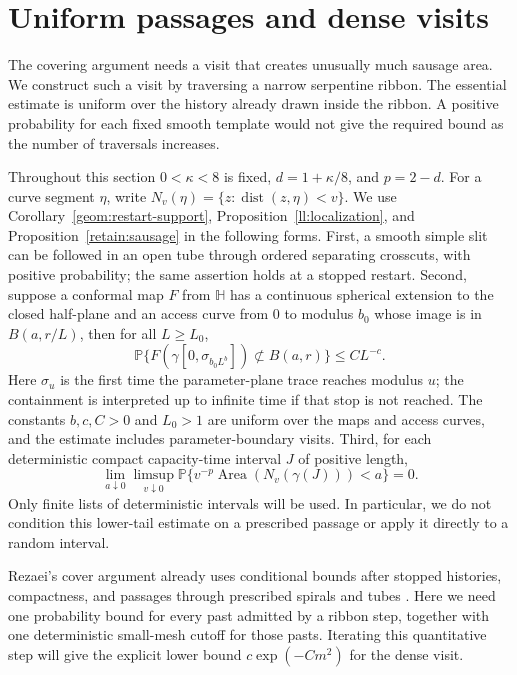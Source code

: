 \documentclass[11pt]{article}
\theoremstyle{definition}
\theoremstyle{remark}
\numberwithin{equation}{section}
\begin{document}
\section{Uniform passages and dense visits}
\label{rc:section}

The covering argument needs a visit that creates unusually much sausage
area.  We construct such a visit by traversing a narrow serpentine ribbon.
The essential estimate is uniform over the history already drawn inside
the ribbon.  A positive probability for each fixed smooth template would
not give the required bound as the number of traversals increases.

Throughout this section $0<\kappa<8$ is fixed,
$d=1+\kappa/8$, and $p=2-d$.  For a curve segment $\eta$, write
$N_v(\eta)=\{z:\operatorname{dist}(z,\eta)<v\}$.
We use Corollary~\ref{geom:restart-support}, Proposition~\ref{ll:localization}, and Proposition~\ref{retain:sausage} in the following forms.  First, a smooth simple
slit can be followed in an open tube through ordered separating
crosscuts, with positive probability; the same assertion holds at a
stopped restart. Second, suppose a conformal map $F$ from $\mathbb H$ has a
continuous spherical extension to the closed half-plane and an access
curve from $0$ to modulus $b_0$ whose image is in $B(a,r/L)$, then
for all $L\ge L_0$,
\begin{equation}\label{rc:localization-input}
 \mathbb P\{F(\gamma[0,\sigma_{b_0L^b}])
                    \not\subset B(a,r)\}\le C L^{-c}.
\end{equation}
Here $\sigma_u$ is the first time the parameter-plane trace reaches modulus
$u$; the containment is interpreted up to infinite time if that stop is
not reached.  The constants $b,c,C>0$ and $L_0>1$ are uniform over the
maps and access curves, and the estimate includes parameter-boundary
visits. Third, for
each deterministic compact capacity-time interval $J$ of positive length,
\begin{equation}\label{rc:sausage-input}
 \lim_{a\downarrow0}\limsup_{v\downarrow0}
   \mathbb P\{v^{-p}\operatorname{Area}(N_v(\gamma(J)))<a\}=0.
\end{equation}
Only finite lists of deterministic intervals will be used.  In
particular, we do not condition this lower-tail estimate on a prescribed
passage or apply it directly to a random interval.

Rezaei's cover argument already uses conditional bounds after stopped
histories, compactness, and passages through prescribed spirals and tubes
\cite[Section~3, Lemmas~3.1--3.3]{rezaei2018}. Here we need one
probability bound for every past admitted by a ribbon step, together
with one deterministic small-mesh cutoff for those pasts. Iterating
this quantitative step will give the explicit lower bound
$c\exp(-Cm^2)$ for the dense visit.
\end{document}
